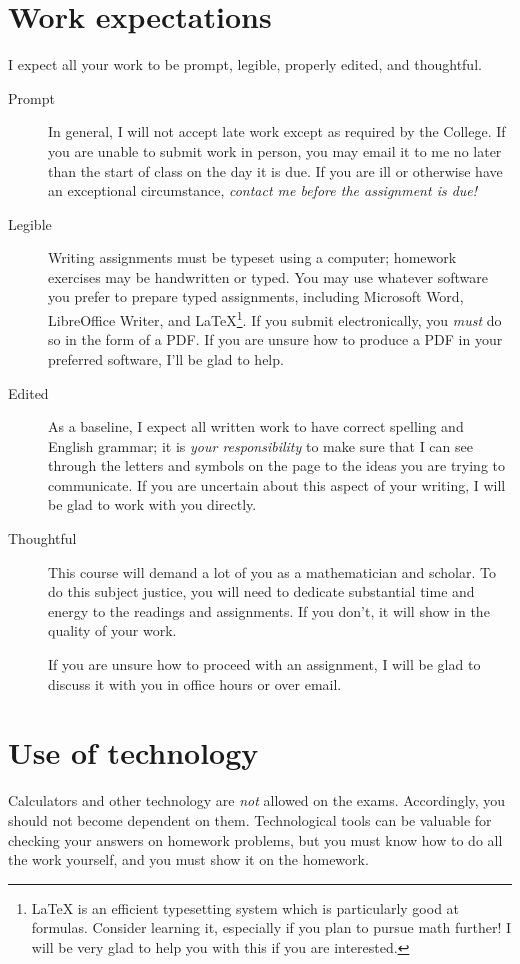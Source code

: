 \documentclass[11pt,article]{memoir}
\begin{document}
\section*{Work expectations}
I expect all your work to be prompt, legible, properly edited, and thoughtful.
\begin{description}
\item[Prompt]
  In general, I will not accept late work except as required by the College.
  If you are unable to submit work in person, you may email it to me no later than the start of class on the day it is due.
  If you are ill or otherwise have an exceptional circumstance, \emph{contact me before the assignment is due!}
  
\item[Legible]
  Writing assignments must be typeset using a computer; homework exercises may be handwritten or typed.
  You may use whatever software you prefer to prepare typed assignments, including Microsoft Word, LibreOffice Writer, and \LaTeX{}\footnote{\LaTeX{} is an efficient typesetting system which is particularly good at formulas. Consider learning it, especially if you plan to pursue math further! I will be very glad to help you with this if you are interested.}.
  If you submit electronically, you \emph{must} do so in the form of a PDF.
  If you are unsure how to produce a PDF in your preferred software, I'll be glad to help.

\item[Edited]
  As a baseline, I expect all written work to have correct spelling and English grammar; it is \emph{your responsibility} to make sure that I can see through the letters and symbols on the page to the ideas you are trying to communicate.
  If you are uncertain about this aspect of your writing, I will be glad to work with you directly.

\item[Thoughtful]
  This course will demand a lot of you as a mathematician and scholar.
  To do this subject justice, you will need to dedicate substantial time and energy to the readings and assignments.
  If you don't, it will show in the quality of your work.
  
  If you are unsure how to proceed with an assignment, I will be glad to discuss it with you in office hours or over email.
\end{description}

\section*{Use of technology}
Calculators and other technology are \emph{not} allowed on the exams.
Accordingly, you should not become dependent on them.
Technological tools can be valuable for checking your answers on homework problems, but you must know how to do all the work yourself, and you must show it on the homework.
\end{document}

